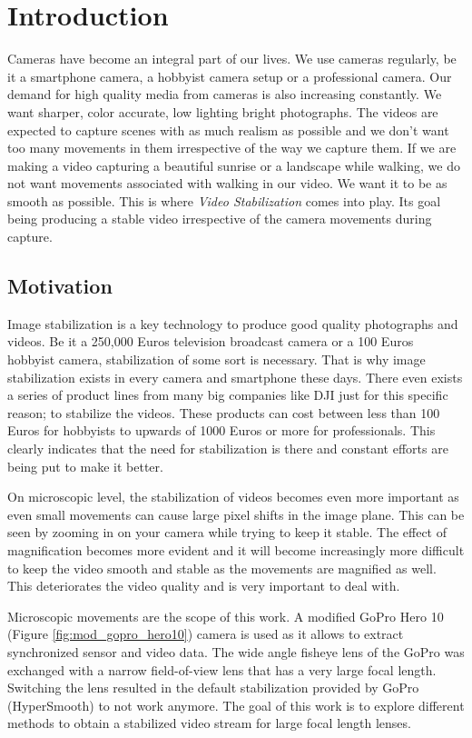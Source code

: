 \chapter{Introduction} \label{chapter_one}

Cameras have become an integral part of our lives. We use cameras regularly, be it a smartphone camera, a hobbyist camera setup or a professional camera. Our demand for high quality media from cameras is also increasing constantly. We want sharper, color accurate, low lighting bright photographs. The videos are expected to capture scenes with as much realism as possible and we don't want too many movements in them irrespective of the way we capture them. If we are making a video capturing a beautiful sunrise or a landscape while walking, we do not want movements associated with walking in our video. We want it to be as smooth as possible. This is where \textit{Video Stabilization} comes into play. Its goal being producing a stable video irrespective of the camera movements during capture.

\section{Motivation}

Image stabilization is a key technology to produce  good quality photographs and videos. Be it a 250,000 Euros television broadcast camera or a 100 Euros hobbyist camera, stabilization of some sort is necessary. That is why image stabilization exists in every camera and smartphone these days. There even exists a series of product lines from many big companies like DJI just for this specific reason; to stabilize the videos. These products can cost between less than 100 Euros for hobbyists to upwards of 1000 Euros or more for professionals. This clearly indicates that the need for stabilization is there and constant efforts are being put to make it better.

On microscopic level, the stabilization of videos becomes even more important as even small movements can cause large pixel shifts in the image plane. This can be seen by zooming in on your camera while trying to keep it stable. The effect of magnification becomes more evident and it will become increasingly more difficult to keep the video smooth and stable as the movements are magnified as well. This deteriorates the video quality and is very important to deal with. 

Microscopic movements are the scope of this work. A modified GoPro Hero 10 (Figure \ref{fig:mod_gopro_hero10}) camera is used as it allows to extract synchronized sensor and video data. The wide angle fisheye lens of the GoPro was exchanged with a narrow field-of-view lens that has a very large focal length. Switching the lens resulted in the default stabilization provided by GoPro (HyperSmooth) to not work anymore. The goal of this work is to explore different methods to obtain a stabilized video stream for large focal length lenses.

